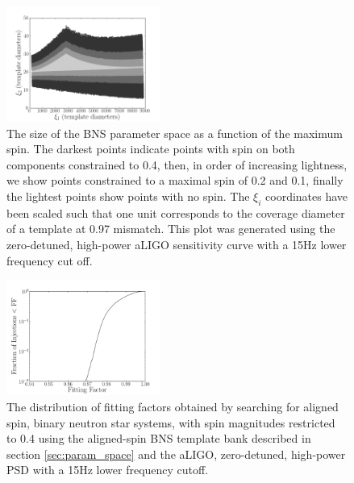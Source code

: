 \begin{figure}
\begin{center}
\includegraphics[width=0.45\textwidth]{papers/bns_spin/figure4.png}
\end{center}
\caption{\label{fig:param_space_spin} The size of the BNS parameter space as a function of the maximum spin.
The darkest points indicate points with spin on both components constrained to 0.4, then, in order of
increasing lightness, we show points constrained
to a maximal spin of 0.2 and 0.1, finally the lightest points show points with no spin. 
The $\xi_i$ coordinates have been scaled
such that one unit corresponds to the coverage diameter of a template
at 0.97 mismatch.
This plot was generated
using the zero-detuned, high-power aLIGO sensitivity curve with a 15Hz lower frequency cut off.}
\end{figure}

\begin{figure}
\begin{center}
\includegraphics[width=0.45\textwidth]{papers/bns_spin/figure5.pdf}
\end{center}
\caption{\label{fig:anstar-aligned} The distribution of fitting factors obtained by searching
for aligned spin, binary neutron star systems, with spin magnitudes restricted to 0.4
using the aligned-spin BNS template bank described in section \ref{sec:param_space}
and the aLIGO, zero-detuned, high-power PSD with a 15Hz lower frequency cutoff.}
\end{figure}

